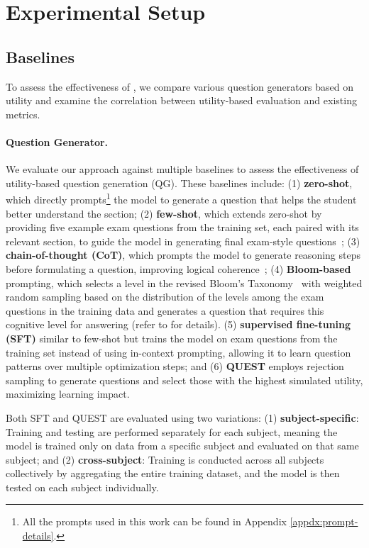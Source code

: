 \section{Experimental Setup}
\label{sec:experiment-setup}

\subsection{Baselines}
To assess the effectiveness of \ours, we compare various question generators based on utility and examine the correlation between utility-based evaluation and existing metrics.

\paragraph{Question Generator.} 
We evaluate our approach against multiple baselines to assess the effectiveness of utility-based question generation (QG). 
These baselines include:
(1) \textbf{zero-shot}, which directly prompts\footnote{All the prompts used in this work can be found in Appendix \ref{appdx:prompt-details}.} the model to generate a question that helps the student better understand the section;
(2) \textbf{few-shot}, which extends zero-shot by providing five example exam questions from the training set, each paired with its relevant section, to guide the model in generating final exam-style questions~\cite{brown2020language};
(3) \textbf{chain-of-thought (CoT)}, which prompts the model to generate reasoning steps before formulating a question, improving logical coherence~\cite{wei2022chain, zhou2024self};
(4) \textbf{Bloom-based} prompting, which selects a level in the revised Bloom's Taxonomy~\cite{krathwohl2002revision_bloom} with weighted random sampling based on the distribution of the levels among the exam questions in the training data and generates a question that requires this cognitive level for answering (refer to  for details).
(5) \textbf{supervised fine-tuning (SFT)} similar to few-shot but trains the model on exam questions from the training set instead of using in-context prompting, allowing it to learn question patterns over multiple optimization steps; and
(6) \textbf{QUEST} employs rejection sampling to generate questions and select those with the highest simulated utility, maximizing learning impact. 

Both SFT and QUEST are evaluated using two variations:
(1) \textbf{subject-specific}: Training and testing are performed separately for each subject, meaning the model is trained only on data from a specific subject and evaluated on that same subject; and
(2) \textbf{cross-subject}: Training is conducted across all subjects collectively by aggregating the entire training dataset, and the model is then tested on each subject individually.

